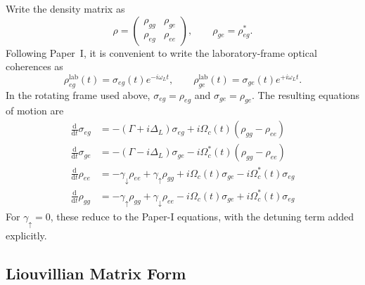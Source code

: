 Write the density matrix as
\begin{equation}
	\rho =
	\begin{pmatrix}
		\rho_{gg} & \rho_{ge} \\
		\rho_{eg} & \rho_{ee}
	\end{pmatrix},
	\qquad
	\rho_{ge} = \rho_{eg}^*.
	\label{eq:oqs_DensityMatrixElements}
\end{equation}
Following Paper~I, it is convenient to write the laboratory-frame optical coherences as
\begin{equation}
	\rho_{eg}^{\mathrm{lab}}(t) = \sigma_{eg}(t)e^{-i\omega_L t}, \qquad
	\rho_{ge}^{\mathrm{lab}}(t) = \sigma_{ge}(t)e^{+i\omega_L t}.
\end{equation}
In the rotating frame used above, \(\sigma_{eg} = \rho_{eg}\) and \(\sigma_{ge} = \rho_{ge}\).
The resulting equations of motion are
\begin{equation}
	\boxed{
		\begin{aligned}
			\frac{\mathrm{d}}{\mathrm{d}t}\sigma_{eg} & = -(\Gamma + i\Delta_L)\sigma_{eg}
			+ i\Omega_c(t)(\rho_{gg} - \rho_{ee}) \\[6pt]
			\frac{\mathrm{d}}{\mathrm{d}t}\sigma_{ge} & = -(\Gamma - i\Delta_L)\sigma_{ge}
			- i\Omega_c^*(t)(\rho_{gg} - \rho_{ee}) \\[6pt]
			\frac{\mathrm{d}}{\mathrm{d}t}\rho_{ee} & = -\gamma_{\downarrow}\rho_{ee}
			+ \gamma_{\uparrow}\rho_{gg}
			+ i\Omega_c(t)\sigma_{ge}
			- i\Omega_c^*(t)\sigma_{eg} \\[6pt]
			\frac{\mathrm{d}}{\mathrm{d}t}\rho_{gg} & = -\gamma_{\uparrow}\rho_{gg}
			+ \gamma_{\downarrow}\rho_{ee}
			- i\Omega_c(t)\sigma_{ge}
			+ i\Omega_c^*(t)\sigma_{eg}
		\end{aligned}
	}
	\label{eq:BlochEquations}
\end{equation}
For \(\gamma_{\uparrow} = 0\), these reduce to the Paper-I equations, with the detuning term added explicitly.

\subsection{Liouvillian Matrix Form}

